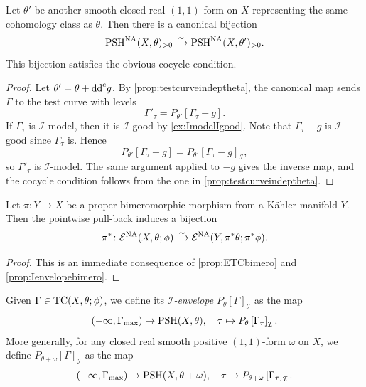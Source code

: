 \begin{proposition}\label{prop:Imodeltestcurveindeptheta}
    Let $\theta'$ be another smooth closed real $(1,1)$-form on $X$ representing the same cohomology class as $\theta$. Then there is a canonical bijection
    \[
    \mathrm{PSH}^{\mathrm{NA}}(X,\theta)_{>0}\xrightarrow{\sim} \mathrm{PSH}^{\mathrm{NA}}(X,\theta')_{>0}.
    \]
    This bijection satisfies the obvious cocycle condition.
\end{proposition}
\begin{proof}
    Let $\theta'=\theta+\mathrm{dd}^{\mathrm{c}} g$. By \cref{prop:testcurveindeptheta}, the canonical map sends $\Gamma$ to the test curve with levels
    \[
        \Gamma'_\tau=P_{\theta'}[\Gamma_\tau-g].
    \]
    If $\Gamma_\tau$ is $\mathcal I$-model, then it is $\mathcal I$-good by \cref{ex:ImodelIgood}. Note that $\Gamma_\tau-g$ is $\mathcal I$-good since $\Gamma_{\tau}$ is. Hence
    \[
        P_{\theta'}[\Gamma_\tau-g]=P_{\theta'}[\Gamma_\tau-g]_{\mathcal I},
    \]
    so $\Gamma'_\tau$ is $\mathcal I$-model. The same argument applied to $-g$ gives the inverse map, and the cocycle condition follows from the one in \cref{prop:testcurveindeptheta}.
\end{proof}


\begin{proposition}\label{prop:ETCIbimero}
    Let $\pi\colon Y\rightarrow X$ be a proper bimeromorphic morphism from a K\"ahler manifold $Y$. Then the pointwise pull-back induces a bijection
    \[
    \pi^*\colon \mathcal{E}^{\mathrm{NA}}(X,\theta;\phi)\xrightarrow{\sim} \mathcal{E}^{\mathrm{NA}}(Y,\pi^*\theta;\pi^*\phi).
    \]
\end{proposition}
\begin{proof}
    This is an immediate consequence of \cref{prop:ETCbimero} and \cref{prop:Ienvelopebimero}.
\end{proof}





\begin{definition}\label{def:TCIenvelope}
    Given $\Gamma\in \mathrm{TC}(X,\theta;\phi)$, we define its \emph{$\mathcal{I}$-envelope} $P_{\theta}[\Gamma]_{\mathcal{I}}$ as the map
    \[
        (-\infty,\Gamma_{\max})\rightarrow \mathrm{PSH}(X,\theta),\quad \tau\mapsto P_{\theta}\left[\Gamma_{\tau}\right]_{\mathcal{I}}.
    \]
        More generally, for any closed real smooth positive $(1,1)$-form $\omega$ on $X$, we define $P_{\theta+\omega}[\Gamma]_{\mathcal{I}}$ as the map
        \[
        (-\infty,\Gamma_{\max})\rightarrow \mathrm{PSH}(X,\theta+\omega),\quad \tau\mapsto P_{\theta+\omega}\left[\Gamma_{\tau}\right]_{\mathcal{I}}.
    \]
\end{definition}

